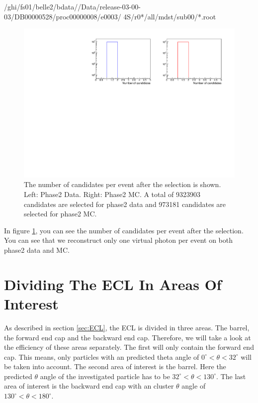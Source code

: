 \documentclass[a4paper,11pt,twosided,final,german,openbib,pdftex,listof=totoc,bibliography=totoc]{scrbook}
\begin{document}
/ghi/fs01/belle2/bdata//Data/release-03-00-03/DB00000528/proc00000008/e0003/ 4S/r0*/all/mdst/sub00/*.root
\newline




\begin{figure}[h!]
	\includegraphics[width=\textwidth]{Plots/master/CCand.pdf}
	\caption[Total Number Of Events After The Selection]{The number of candidates per event after the selection is shown. Left: Phase2 Data. Right: Phase2 MC. A total of 9323903 candidates are selected for phase2 data and 973181 candidates are selected for phase2 MC.}
	\label{fig:nCandAS}
\end{figure}






In figure \ref{fig:nCandAS}, you can see the number of candidates per event after the selection. You can see that we reconstruct only one virtual photon per event on both phase2 data and MC.






\section{Dividing The ECL In Areas Of Interest}
\label{sec:DivECL}

As described in section \ref{sec:ECL}, the ECL is divided in three areas. The barrel, the forward end cap and the backward end cap. Therefore, we will take a look at the efficiency of these areas separately. The first will only contain the forward end cap. This means, only particles with an predicted theta angle of $0^\circ <\theta<32^\circ$ will be taken into account. The second area of interest is the barrel. Here the predicted $\theta$ angle of the investigated particle has to be $32^\circ < \theta < 130^\circ$. The last area of interest is the backward end cap with an cluster $\theta$ angle of $130^\circ <\theta < 180^\circ$.  
\end{document}
